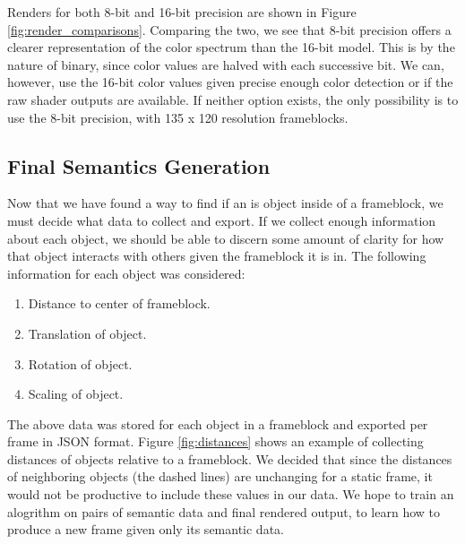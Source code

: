 \documentclass[conference]{IEEEtran}
\begin{document}
Renders for both 8-bit and 16-bit precision are shown in
Figure \ref{fig:render_comparisons}.
Comparing the two, we see that 8-bit precision offers a clearer representation
of the color spectrum than the 16-bit model.
This is by the nature of binary, since color values are halved with each successive bit.
We can, however, use the 16-bit color values given precise enough color detection
or if the raw shader outputs are available.
If neither option exists, the only possibility is to use the 8-bit precision,
with 135 x 120 resolution frameblocks.

\subsection{Final Semantics Generation}
Now that we have found a way to find if an is object inside of a frameblock,
we must decide what data to collect and export.
If we collect enough information about each object,
we should be able to discern some amount of clarity
for how that object interacts with others given the frameblock it is in.
The following information for each object was considered:
\bigskip
\begin{enumerate}
\item Distance to center of frameblock.
\item Translation of object.
\item Rotation of object.
\item Scaling of object.
\end{enumerate}
\bigskip

The above data was stored for each object in a frameblock and exported
per frame in JSON format.
Figure \ref{fig:distances} shows an example of collecting
distances of objects relative to a frameblock.
We decided that since the distances of neighboring objects (the dashed lines)
are unchanging for a static frame, it would not be productive to include these values
in our data.
We hope to train an alogrithm on pairs of semantic data and final rendered output,
to learn how to produce a new frame given only its semantic data.
\end{document}
